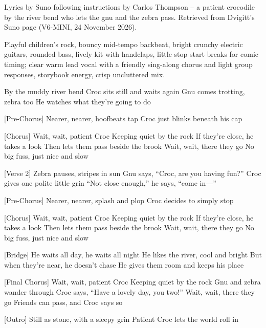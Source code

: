 \begin{notes}
Lyrics by Suno following instructions by Carlos Thompson -- a patient crocodile by the river bend who lets the gnu and the zebra pass. Retrieved from Dvigitt's Suno page (V6-MINI, 24 November 2026).
\end{notes}
\begin{style}
Playful children’s rock, bouncy mid-tempo backbeat, bright crunchy electric guitars, rounded bass, lively kit with handclaps, little stop-start breaks for comic timing; clear warm lead vocal with a friendly sing-along chorus and light group responses, storybook energy, crisp uncluttered mix.
\end{style}
\begin{lyrics}
[Verse 1]
By the muddy river bend
Croc sits still and waits again
Gnu comes trotting, zebra too
He watches what they’re going to do

[Pre-Chorus]
Nearer, nearer, hoofbeats tap
Croc just blinks beneath his cap

[Chorus]
Wait, wait, patient Croc
Keeping quiet by the rock
If they’re close, he takes a look
Then lets them pass beside the brook
Wait, wait, there they go
No big fuss, just nice and slow

[Verse 2]
Zebra pauses, stripes in sun
Gnu says, “Croc, are you having fun?”
Croc gives one polite little grin
“Not close enough,” he says, “come in—”

[Pre-Chorus]
Nearer, nearer, splash and plop
Croc decides to simply stop

[Chorus]
Wait, wait, patient Croc
Keeping quiet by the rock
If they’re close, he takes a look
Then lets them pass beside the brook
Wait, wait, there they go
No big fuss, just nice and slow

[Bridge]
He waits all day, he waits all night
He likes the river, cool and bright
But when they’re near, he doesn’t chase
He gives them room and keeps his place

[Final Chorus]
Wait, wait, patient Croc
Keeping quiet by the rock
Gnu and zebra wander through
Croc says, “Have a lovely day, you two!”
Wait, wait, there they go
Friends can pass, and Croc says so

[Outro]
Still as stone, with a sleepy grin
Patient Croc lets the world roll in
\end{lyrics}
